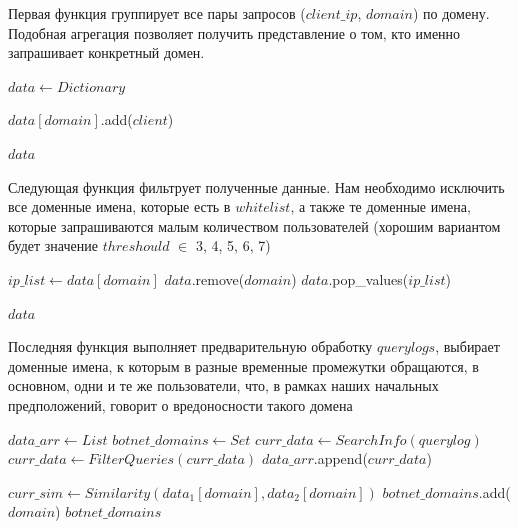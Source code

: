 \documentclass[a4paper,14pt]{extreport} %
\begin{document}
Первая функция группирует все пары запросов ($client\_ip$, $domain$) по домену. Подобная агрегация позволяет получить представление о том, кто именно запрашивает конкретный домен.
\begin{algorithmic}
	\State $data\gets Dictionary$
				
	\State $data[domain]$.add($client$)
	\EndFor
				
	\State \Return $data$
	\EndFunction
\end{algorithmic}

Следующая функция фильтрует полученные данные. Нам необходимо исключить все доменные имена, которые есть в $whitelist$, а также те доменные имена, которые запрашиваются малым количеством пользователей (хорошим вариантом будет значение $threshould$ $\in$ 3, 4, 5, 6, 7)
	

\begin{algorithmic}
	\State $ip\_list\gets data[domain]$
	\State $data$.remove($domain$)
	\State $data$.pop\_values($ip\_list$)
	\EndIf
					
					
	\EndFor
	\State \Return $data$
	\EndFunction
\end{algorithmic}
	
Последняя функция выполняет предварительную обработку $querylogs$, выбирает доменные имена, к которым в разные временные промежутки обращаются, в основном, одни и те же пользователи, что, в рамках наших начальных предположений, говорит о вредоносности такого домена
\begin{algorithmic}
	\State $data\_arr\gets List$
	\State $botnet\_domains\gets Set$
	\State $curr\_data\gets SearchInfo(querylog)$
	\State $curr\_data\gets FilterQueries(curr\_data)$
	\State $data\_arr$.append($curr\_data$)
			
	\EndFor
	\State $curr\_sim\gets Similarity(data_1[domain], data_2[domain])$
	\State $botnet\_domains$.add($domain$)
	\EndIf
	\EndFor
	\EndIf
	\EndFor
	\EndFor
	\State \Return $botnet\_domains$
	\EndFunction
\end{algorithmic}
	
\end{document}
